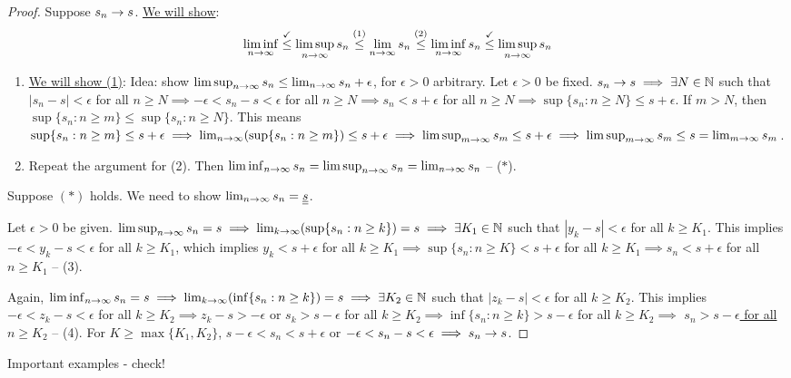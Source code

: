 \documentclass[]{article}
\begin{document}
\begin{proof}
	\say{$\implies$} Suppose $s_n\rightarrow s$. \ul{We will show}: 
	$$ \liminf_{n\rightarrow\infty} \overset{\checkmark}{\leq} \limsup_{n\rightarrow\infty} s_n \overset{(1)}{\leq} \lim_{n\rightarrow\infty} s_n \overset{(2)}{\leq} \liminf_{n\rightarrow\infty} s_n \overset{\checkmark}{\leq} \limsup_{n\rightarrow\infty} s_n$$
	\begin{enumerate}
		\item \ul{We will show (1)}: Idea: show $\limsup_{n\rightarrow\infty} s_n \leq \lim_{n\rightarrow\infty} s_n + \epsilon$, for $\epsilon > 0$ arbitrary.
			Let $\epsilon > 0$ be fixed. $s_n\rightarrow s\implies \exists N\in\mathbb{N}$ such that $|s_n-s|<\epsilon$ for all $n\geq N \implies -\epsilon < s_n-s < \epsilon$ for all $n\geq N \implies s_n < s+\epsilon$ for all $n\geq N \implies \sup\{s_n:n\geq N\}\leq s+\epsilon$.
			If $m>N$, then $\sup\{s_n:n\geq m\} \leq \sup\{s_n:n\geq N\}$.
			This means $\sup\{s_n:n\geq m\}\leq s+\epsilon \implies \lim_{n\rightarrow\infty}(\sup\{s_n:n\geq m\})\leq s+\epsilon \implies \limsup_{m\rightarrow\infty} s_m \leq s+\epsilon \implies \limsup_{m\rightarrow\infty} s_m \leq s = \lim_{m\rightarrow\infty} s_m$.
		\item Repeat the argument for (2).
			Then $\liminf_{n\rightarrow\infty} s_n = \limsup_{n\rightarrow\infty} s_n = \lim_{n\rightarrow\infty} s_n$ -- ($*$).
	\end{enumerate}
	\say{$\Lra$} Suppose $(*)$ holds. We need to show $\lim_{n\rightarrow\infty} s_n = \underline{\underline{s}}$.
	
	Let $\epsilon>0$ be given. $\limsup_{n\rightarrow\infty}s_n = s \implies \lim_{k\rightarrow\infty}(\sup\{s_n:n\geq k\}) = s \implies \exists K_1\in\mathbb{N} $ such that $|y_k-s|<\epsilon$ for all $k\geq K_1$.
	This implies $-\epsilon < y_k-s<\epsilon$ for all $k\geq K_1$, which implies $y_k < s+\epsilon$ for all $k\geq K_1 \implies \sup\{s_n:n\geq K\} < s+\epsilon$ for all $k\geq K_1 \implies s_n<s+\epsilon$ for all $n\geq K_1$ -- (3).

	Again, $\liminf_{n\rightarrow\infty} s_n = s \implies \lim_{k\rightarrow\infty}(\inf\{s_n:n\geq k\}) = s \implies \exists K_2\in\mathbb{N}$ such that $|z_k -s|<\epsilon$ for all $k\geq K_2$.
	This implies $-\epsilon < z_k - s< \epsilon$ for all $k\geq K_2 \implies z_k-s>-\epsilon$ or $s_k > s-\epsilon$ for all $k\geq K_2 \implies \inf\{s_n:n\geq k\} > s-\epsilon$ for all $k\geq K_2 \implies$ \ul{$s_n>s-\epsilon$ for all $n\geq K_2$} -- (4).
	For $K\geq \max\{K_1,K_2\}$, $s-\epsilon <s_n < s+\epsilon$ or $-\epsilon < s_n-s < \epsilon \implies s_n\rightarrow s$.
\end{proof}

\begin{theorem}
	 Important examples - check!
\end{theorem}
\end{document}
